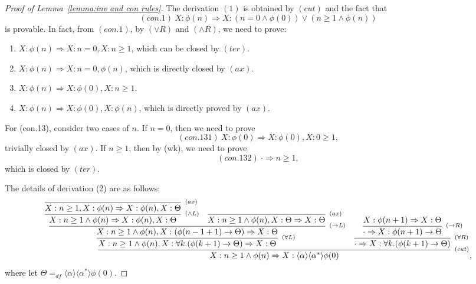 \documentclass[manuscript,screen]{acmart}
\newcommand{\la}[0]{\langle}
\newcommand{\ra}[0]{\rangle}
\newcommand{\dddef}[0]{=_{df}}
\newcommand{\true}[0]{\mathit{true}}
\DeclareMathOperator{\seq}{;}
\newcommand{\lup}[0]{*}
\newcommand{\BL}[0]{\mbox{BL}}
\begin{document}
\begin{proof}[Proof of Lemma~\ref{lemma:inv and con rules}]
The derivation $(1)$ is obtained by $(cut)$ and the fact that 
$$(con.1)\ X : \phi(n)\Rightarrow X : (n = 0\wedge \phi(0))\vee (n \ge 1\wedge \phi(n))$$
 is provable. 
 In fact, from $(con.1)$, by $(\vee R)$ and $(\wedge R)$, we need to prove:
 \begin{enumerate}
 \item[(con.11)] $X : \phi(n)\Rightarrow X : n=0, X : n\ge 1$, which can be closed by $(ter)$.
 \item[(con.12)] $X : \phi(n)\Rightarrow X : n=0, \phi(n)$, which is directly closed by $(ax)$.
 \item[(con.13)] $X : \phi(n)\Rightarrow X : \phi(0), X : n\ge 1$.
 \item[(con.14)] $X : \phi(n)\Rightarrow X : \phi(0), X : \phi(n)$, which is directly proved by $(ax)$.    
 \end{enumerate}
 For (con.13), consider two cases of $n$. If $n = 0$, then we need to prove
 $$
(con.131)\ X : \phi(0)\Rightarrow X : \phi(0), X : 0\ge 1, 
 $$
 trivially closed by $(ax)$. 
 If $n\ge 1$, then by (wk), we need to prove
 $$
 (con.132)\ \cdot \Rightarrow n\ge 1, 
 $$
 which is closed by $(ter)$. 

The details of derivation (2) are as follows: 
 $$
\infer[^{(cut)}]
{X : n\ge 1\wedge\phi(n)\Rightarrow X : \la\alpha\ra\la\alpha^\lup\ra\phi(0)}
{
    \infer[^{(\forall L)}]
    {X : n\ge 1\wedge\phi(n), X : \forall k.(\phi(k + 1)\to \Theta)\Rightarrow X : \Theta}
    {
        \infer[^{(\to L)}]
        {X : n\ge 1\wedge\phi(n), X : (\phi(n - 1 + 1)\to \Theta)\Rightarrow X : \Theta}
        {
            \infer[^{(\wedge L)}]
            {X : n\ge 1\wedge\phi(n)\Rightarrow X : \phi(n), X : \Theta}
            {
                \infer[^{(ax)}]
                {X : n\ge 1, X : \phi(n)\Rightarrow X : \phi(n), X : \Theta}
                {
                }
            }
            &
            \infer[^{(ax)}]
            {X : n\ge 1\wedge\phi(n), X : \Theta\Rightarrow X : \Theta}
            {
            }
        }
    }
    &
    \infer[^{(\forall R)}]
    {\cdot \Rightarrow X : \forall k.(\phi(k + 1)\to \Theta)}
    {
        \infer[^{(\to R)}]
        {\cdot\Rightarrow X : \phi(n+1) \to \Theta}
        {
            X : \phi(n+1)\Rightarrow X : \Theta
        }
    }
}, 
$$
where let $\Theta \dddef \la\alpha\ra\la\alpha^\lup\ra\phi(0)$. 




\end{proof}
\end{document}

